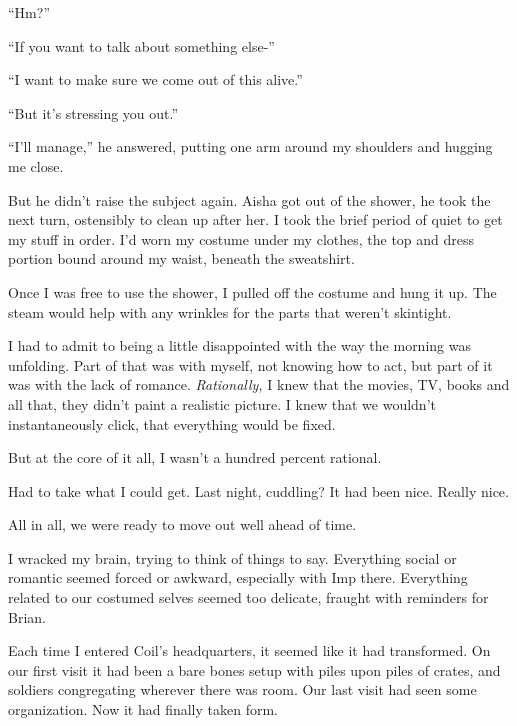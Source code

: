 ``Hm?''



``If you want to talk about something else-''



``I want to make sure we come out of this alive.''



``But it's stressing you out.''



``I'll manage,'' he answered, putting one arm around my shoulders and hugging me close.



But he didn't raise the subject again.  Aisha got out of the shower, he took the next turn, ostensibly to clean up after her.  I took the brief period of quiet to get my stuff in order.  I'd worn my costume under my clothes, the top and dress portion  bound around my waist, beneath the sweatshirt.



Once I was free to use the shower, I pulled off the costume and hung it up.  The steam would help with any wrinkles for the parts that weren't skintight.



I had to admit to being a little disappointed with the way the morning was unfolding.  Part of that was with myself, not knowing how to act, but part of it was with the lack of romance.  \emph{Rationally}\emph{, }I knew that the movies, TV, books and all that, they didn't paint a realistic picture.  I knew that we wouldn't instantaneously click, that everything would be fixed.



But at the core of it all, I wasn't a hundred percent rational.



Had to take what I could get.  Last night, cuddling?  It had been nice.  Really nice.



All in all, we were ready to move out well ahead of time.



I wracked my brain, trying to think of things to say.  Everything social or romantic seemed forced or awkward, especially with Imp there.  Everything related to our costumed selves seemed too delicate, fraught with reminders for Brian.



Each time I entered Coil's headquarters, it seemed like it had transformed.  On our first visit it had been a bare bones setup with piles upon piles of crates, and soldiers congregating wherever there was room.  Our last visit had seen some organization.  Now it had finally taken form.



